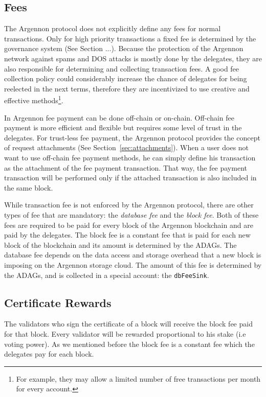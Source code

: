 
\subsection{Fees}\label{subsec:fees}

The Argennon protocol does not explicitly define any fees for normal transactions. Only for high priority
transactions a fixed fee is determined by the governance system (See Section ...). Because the protection of the
Argennon network against spams and DOS attacks is mostly done by the delegates, they are also responsible for
determining and collecting transaction fees. A good fee collection policy could considerably increase the chance of
delegates for being reelected in the next terms, therefore they are incentivized to use creative and effective
methods\footnote{For example, they may
allow a limited number of free transactions per month for every account.}.

In Argennon fee payment can be done off-chain or on-chain. Off-chain fee payment is more efficient and flexible but
requires some level of trust in the delegates. For trust-less fee payment, the Argennon protocol provides the
concept of request attachments (See Section~\ref{sec:attachments}).
When a user does not want to use off-chain fee payment methods, he can simply define his transaction as the attachment
of the fee payment transaction. That way, the fee payment transaction will be performed only if the attached
transaction is also included in the same block.

While transaction fee is not enforced by the Argennon protocol, there are other types of fee that are mandatory: the
\emph{database fee} and the \emph{block fee}. Both of these fees are required to be paid for every block of the Argennon
blockchain and are paid by the delegates. The block fee is a constant fee that is paid for each new block of the
blockchain and its amount is
determined by the ADAGs. The database fee depends on the data access and storage overhead that a new block
is imposing on the Argennon storage cloud. The amount of this fee is determined by the ADAGs, and is collected in
a special account: the \texttt{dbFeeSink}.

\subsection{Certificate Rewards}\label{subsec:rewards}

The validators who sign the certificate of a block will receive the block fee paid for that block. Every validator
will be rewarded
proportional to his stake (i.e voting power). As we mentioned before the block fee is a constant fee which the
delegates pay for each block.

